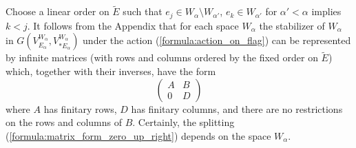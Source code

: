 \documentclass[11pt, a4paper]{article}
\begin{document}
Choose a linear order on $\widetilde{E}$ such that $e_j\in W_{\alpha} \setminus W_{\alpha'}$, $e_k\in W_{\alpha'}$ for $\alpha'<\alpha$ implies $k<j$.  It follows from the Appendix that for each space $W_{\alpha}$ the stabilizer of $W_{\alpha}$ in $ G \left( V^{W_{\alpha}}_{E_{\alpha}}, V^{W_{\alpha}}_{*E_{\alpha}}\right)$ under the action (\ref{formula:action_on_flag}) can be represented by infinite matrices (with rows and columns ordered by the fixed order on $\widetilde{E}$) %
which, together with their inverses, have the form \begin{equation}\label{formula:matrix_form_zero_up_right}
    \left(\begin{array}{c|c}
A & B  \\
\hline
0 & D  \end{array}\right)
\end{equation}
where $A$ has finitary rows, $D$ has finitary columns, and there are no restrictions on the rows and columns of $B$. Certainly, the splitting (\ref{formula:matrix_form_zero_up_right}) depends on the space $W_{\alpha}$.
\end{document}
